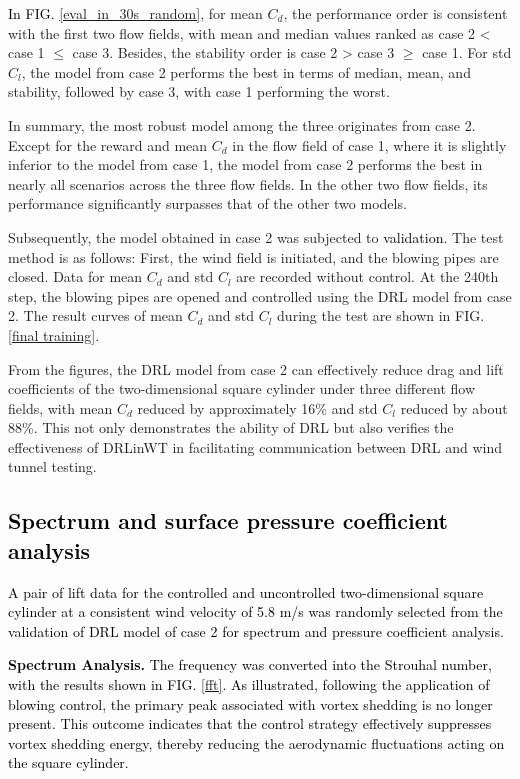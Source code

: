 \documentclass[%
 aip,
 amsmath,amssymb,
 reprint,%
]{revtex4-1}
\newcommand{\black}[1]{\textcolor{black}{#1}}
\begin{document}
\black{In FIG. \ref{eval_in_30s_random}}, for mean $C_d$, the performance order is consistent with the first two flow fields, with mean and median values ranked as case 2 < case 1 $\le$ case 3. Besides, the stability order is case 2 > case 3 $\ge$ case 1. For std $C_l$, the model from case 2 performs the best in terms of median, mean, and stability, followed by case 3, with case 1 performing the worst.

In summary, the most robust model among the three originates from case 2. Except for the reward and mean $C_d$ in the flow field of case 1, where it is slightly inferior to the model from case 1, the model from case 2 performs the best in nearly all scenarios across the three flow fields. In the other two flow fields, its performance significantly surpasses that of the other two models.

Subsequently, the model obtained in case 2 was subjected to \black{validation}. The test method is as follows: First, the wind field is initiated, and the blowing pipes are closed. Data for mean $C_d$ and std $C_l$ are recorded without control. At the 240th step, the blowing pipes are opened and controlled using the DRL model from case 2. The result curves of mean $C_d$ and std $C_l$ during the test are shown in FIG. \ref{final training}.

From the figures, the DRL model from case 2 can effectively reduce drag and lift coefficients of the two-dimensional square cylinder under three different flow fields, with mean $C_d$ reduced by approximately 16\% and std $C_l$ reduced by about 88\%. This not only demonstrates the ability of DRL but also verifies the effectiveness of DRLinWT in facilitating communication between DRL and wind tunnel testing.

\subsection{\black{Spectrum and surface pressure coefficient analysis}}

\black{A pair of lift data for the controlled and uncontrolled two-dimensional square cylinder at a consistent wind velocity of 5.8 m/s was randomly selected from the validation of DRL model of case 2 for spectrum and pressure coefficient analysis.}

\black{\textbf{Spectrum Analysis.} The frequency was converted into the Strouhal number, with the results shown in FIG. \ref{fft}. As illustrated, following the application of blowing control, the primary peak associated with vortex shedding is no longer present. This outcome indicates that the control strategy effectively suppresses vortex shedding energy, thereby reducing the aerodynamic fluctuations acting on the square cylinder.}
\end{document}
